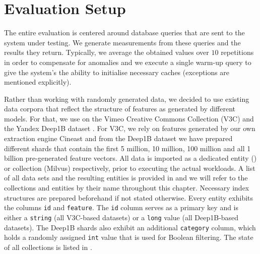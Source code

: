 \section{Evaluation Setup}

The entire evaluation is centered around database queries that are sent to the system under testing. We generate measurements from these queries and the results they return. Typically, we average the obtained values over $10$ repetitions in order to compensate for anomalies and we execute a single warm-up query to give the system's the ability to initialise necessary caches (exceptions are mentioned explicitly). 

Rather than working with randomly generated data, we decided to use existing data corpora that reflect the structure of features as generated by different models. For that, we use on the Vimeo Creative Commons Collection (V3C) \cite{Berns:2019V3C1,Rossetto:2021Insights} and the Yandex Deep1B dataset \cite{Babenko:2016Efficient}. For V3C, we rely on features generated by our own extraction engine Cineast \cite{Rossetto:2016Vitrivr} and from the Deep1B dataset we have prepared different shards that contain the first 5 million, 10 million, 100 million and all 1 billion pre-generated feature vectors. All data is imported as a dedicated entity (\cottontail{}) or collection (Milvus) respectively, prior to executing the actual workloads. A list of all data sets and the resulting entities is provided in  and we will refer to the collections and entities by their name throughout this chapter.
Necessary index structures are prepared beforehand if not stated otherwise. Every entity exhibits the columns \texttt{id} and \texttt{feature}. The \texttt{id} column serves as a primary key and is either a \texttt{string} (all V3C-based datasets) or a \texttt{long} value (all Deep1B-based datasets). The Deep1B shards also exhibit an additional \texttt{category} column, which holds a randomly assigned \texttt{int} value that is used for Boolean filtering. The state of all collections is listed in .

